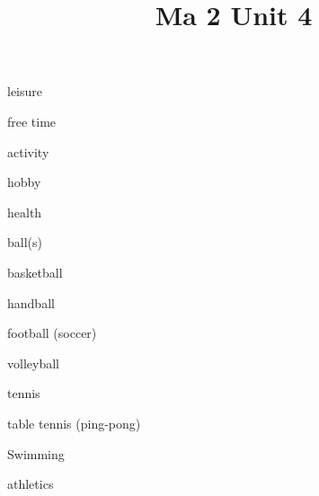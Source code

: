 \documentclass[avery5371,grid,frame]{flashcards}
\title{Ma 2 Unit 4}
\begin{document}
\begin{flashcard}{\LARGE leisure}
\LARGE {}
\end{flashcard}
\begin{flashcard}{\LARGE free time}
\LARGE {}
\end{flashcard}
\begin{flashcard}{\LARGE activity}
\LARGE {}
\end{flashcard}
\begin{flashcard}{\LARGE hobby}
\LARGE {}
\end{flashcard}
\begin{flashcard}{\LARGE health}
\LARGE {}
\end{flashcard}
\begin{flashcard}{\LARGE ball(s)}
\LARGE {}
\end{flashcard}
\begin{flashcard}{\LARGE basketball}
\LARGE {}
\end{flashcard}
\begin{flashcard}{\LARGE handball}
\LARGE {}
\end{flashcard}
\begin{flashcard}{\LARGE football (soccer)}
\LARGE {}
\end{flashcard}
\begin{flashcard}{\LARGE volleyball}
\LARGE {}
\end{flashcard}
\begin{flashcard}{\LARGE tennis}
\LARGE {}
\end{flashcard}
\begin{flashcard}{\LARGE table tennis (ping-pong)}
\LARGE {}
\end{flashcard}
\begin{flashcard}{\LARGE Swimming}
\LARGE {}
\end{flashcard}
\begin{flashcard}{\LARGE athletics}
\LARGE {}
\end{flashcard}
\end{document}
